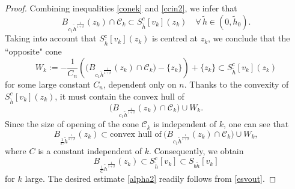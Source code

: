 \documentclass[11pt]{amsart}
\theoremstyle{plain}
\newcommand{\0}{\textbf{0}}
\numberwithin{equation}{section}
\numberwithin{equation}{section}
\numberwithin{figure}{section}
\begin{document}
\begin{proof}
Combining inequalities \eqref{conek} and \eqref{ccin2}, we infer that
\[ 
B_{c_1\tilde{h}^{\frac{1}{1+\beta}}} (z_k)\cap \mathcal{C}_k\subset S^c_{\tilde{h}}[v_k](z_k)\quad\forall\,\tilde{h}\in (0, \tilde h_0).
\]
Taking into account that \( S^c_{\tilde{h}}[v_k](z_k) \) is centred at \( z_k \), we conclude that the ``opposite" cone
\[
W_k := -\frac{1}{C_n}\left( \big(B_{c_1\tilde{h}^{\frac{1}{1+\beta}}} (z_k) \cap \mathcal{C}_k\big) - \{z_k\} \right) + \{z_k\} \subset S^c_{\tilde{h}}[v_k](z_k)
\]
for some large constant \( C_n \), dependent only on \( n \).
Thanks to the convexity of \( S^c_{\tilde{h}}[v_k](z_k) \), it must contain the convex hull of
\[ 
\big(B_{c_1\tilde{h}^{\frac{1}{1+\beta}}} (z_k)\cap \mathcal{C}_k\big) \cup W_k.
\]
Since the size of opening of the cone $\mathcal{C}_k$ is independent of $k$, one can see that
\[ 
B_{\frac{1}{C}\tilde{h}^{\frac{1}{1+\beta}}}(z_k) \subset \text{convex hull of}\  \big(B_{c_1\tilde{h}^{\frac{1}{1+\beta}}} (z_k)\cap \mathcal{C}_k\big) \cup W_k,
\]
where \( C \) is a constant independent of \( k \). Consequently, we obtain
	\begin{equation} \label{esvout}
		B_{\frac{1}{C}\tilde{h}^{\frac{1}{1+\beta}}}(z_k) \subset S^c_{\tilde h}[v_k]\subset S_{b\tilde{h}}[v_k]
	\end{equation}
for $k$ large. The desired estimate \eqref{alpha2} readily follows from \eqref{esvout}.
\end{proof}
\end{document}
